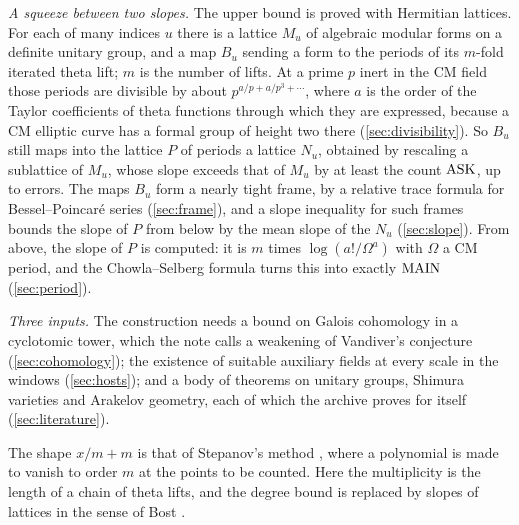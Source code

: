 \emph{A squeeze between two slopes.} The upper bound is proved with Hermitian lattices. For
each of many indices $u$ there is a lattice $M_u$ of algebraic modular forms on a definite
unitary group, and a map $B_u$ sending a form to the periods of its $m$-fold iterated theta
lift; $m$ is the number of lifts. At a prime $p$ inert in the CM field those periods are
divisible by about $p^{a/p+a/p^3+\cdots}$, where $a$ is the order of the Taylor coefficients
of theta functions through which they are expressed, because a CM elliptic curve has a formal
group of height two there (\cref{sec:divisibility}). So $B_u$ still maps into the lattice $P$
of periods a lattice $N_u$, obtained by rescaling a sublattice of $M_u$, whose slope exceeds
that of $M_u$ by at least the count $\mathrm{ASK}$, up to errors. The maps $B_u$ form a nearly tight frame, by a relative trace
formula for Bessel--Poincar\'e series (\cref{sec:frame}), and a slope inequality for such
frames bounds the slope of $P$ from below by the mean slope of the $N_u$ (\cref{sec:slope}).
From above, the slope of $P$ is computed: it is $m$ times $\log(a!/\Omega^a)$ with $\Omega$ a
CM period, and the Chowla--Selberg formula turns this into exactly $\mathrm{MAIN}$
(\cref{sec:period}).

\emph{Three inputs.} The construction needs a bound on Galois cohomology in a cyclotomic tower,
which the note calls a weakening of Vandiver's conjecture (\cref{sec:cohomology}); the
existence of suitable auxiliary fields at every scale in the windows (\cref{sec:hosts}); and a
body of theorems on unitary groups, Shimura varieties and Arakelov geometry, each of which the
archive proves for itself (\cref{sec:literature}).

The shape $x/m+m$ is that of Stepanov's method \cite{stepanov1969,bombieri1974,schmidt1976equations}, where a
polynomial is made to vanish to order $m$ at the points to be counted. Here the multiplicity is
the length of a chain of theta lifts, and the degree bound is replaced by slopes of lattices in
the sense of Bost \cite{bost1996,bost2001,chambertloir2002theoremes}.

